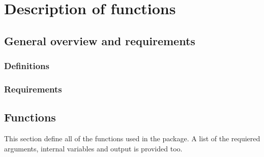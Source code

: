 \chapter{Description of functions}\label{Functions}
\section{General overview and requirements}

\subsection{Definitions}
\subsection{Requirements}

\section{Functions}
This section define all of the functions used in the package. A list of the requiered arguments, internal variables and output is provided too.






















